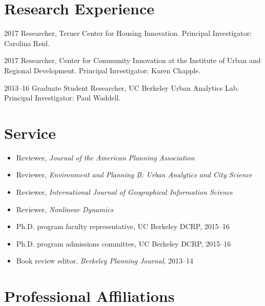 \documentclass{academiccv}
\begin{document}
\section*{Research Experience}

\begin{tablist}
	
\item[2017] 	\tab Researcher, Terner Center for Housing Innovation. Principal Investigator: Carolina Reid.

\item[2017] 	\tab Researcher, Center for Community Innovation at the Institute of Urban and Regional Development. Principal Investigator: Karen Chapple.

\item[2013--16] \tab Graduate Student Researcher, UC Berkeley Urban Analytics Lab. Principal Investigator: Paul Waddell.

\end{tablist}



\section*{Service}

\begin{itemize}

\item Reviewer, \emph{Journal of the American Planning Association}

\item Reviewer, \emph{Environment and Planning B: Urban Analytics and City Science}

\item Reviewer, \emph{International Journal of Geographical Information Science}

\item Reviewer, \emph{Nonlinear Dynamics}

\item Ph.D. program faculty representative, UC Berkeley DCRP, 2015--16

\item Ph.D. program admissions committee, UC Berkeley DCRP, 2015--16

\item Book review editor, \emph{Berkeley Planning Journal}, 2013--14

\end{itemize}



\section*{Professional Affiliations}
\end{document}
